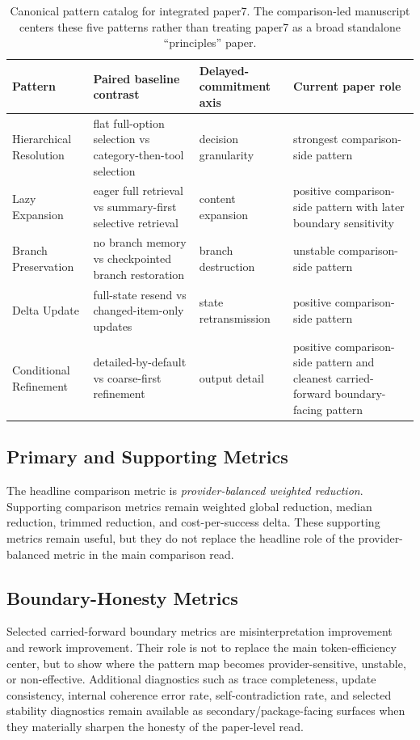 \documentclass[11pt,a4paper]{article}
\begin{document}
\begin{table}[t]
\centering
\small
\begin{tabular}{p{3.2cm}p{4.6cm}p{3.0cm}p{3.4cm}}
\toprule
\textbf{Pattern} & \textbf{Paired baseline contrast} & \textbf{Delayed-commitment axis} & \textbf{Current paper role} \\
\midrule
Hierarchical Resolution & flat full-option selection vs category-then-tool selection & decision granularity & strongest comparison-side pattern \\
Lazy Expansion & eager full retrieval vs summary-first selective retrieval & content expansion & positive comparison-side pattern with later boundary sensitivity \\
Branch Preservation & no branch memory vs checkpointed branch restoration & branch destruction & unstable comparison-side pattern \\
Delta Update & full-state resend vs changed-item-only updates & state retransmission & positive comparison-side pattern \\
Conditional Refinement & detailed-by-default vs coarse-first refinement & output detail & positive comparison-side pattern and cleanest carried-forward boundary-facing pattern \\
\bottomrule
\end{tabular}
\caption{Canonical pattern catalog for integrated paper7. The comparison-led manuscript centers these five patterns rather than treating paper7 as a broad standalone ``principles'' paper.}
\label{tab:pattern_catalog}
\end{table}

\subsection{Primary and Supporting Metrics}

The headline comparison metric is \emph{provider-balanced weighted reduction}. Supporting comparison metrics remain weighted global reduction, median reduction, trimmed reduction, and cost-per-success delta. These supporting metrics remain useful, but they do not replace the headline role of the provider-balanced metric in the main comparison read.

\subsection{Boundary-Honesty Metrics}

Selected carried-forward boundary metrics are misinterpretation improvement and rework improvement. Their role is not to replace the main token-efficiency center, but to show where the pattern map becomes provider-sensitive, unstable, or non-effective. Additional diagnostics such as trace completeness, update consistency, internal coherence error rate, self-contradiction rate, and selected stability diagnostics remain available as secondary/package-facing surfaces when they materially sharpen the honesty of the paper-level read.
\end{document}

